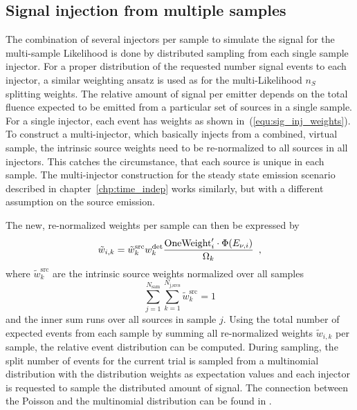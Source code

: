 \subsection{Signal injection from multiple samples}
The combination of several injectors per sample to simulate the signal for the multi-sample Likelihood is done by distributed sampling from each single sample injector.
For a proper distribution of the requested number signal events to each injector, a similar weighting ansatz is used as for the multi-Likelihood $n_S$ splitting weights.
The relative amount of signal per emitter depends on the total fluence expected to be emitted from a particular set of sources in a single sample.
For a single injector, each event has weights as shown in~(\ref{equ:sig_inj_weights}).
To construct a multi-injector, which basically injects from a combined, virtual sample, the intrinsic source weights need to be re-normalized to all sources in all injectors.
This catches the circumstance, that each source is unique in each sample.
The multi-injector construction for the steady state emission scenario described in chapter~\ref{chp:time_indep} works similarly, but with a different assumption on the source emission.

The new, re-normalized weights per sample can then be expressed by
\begin{equation}
    \tilde{w}_{i,k}
    = \tilde{w}_k^\text{src} w_k^\text{det}
      \frac{\text{OneWeight}'_i \cdot \Phi(E_{\nu,i})}{\Omega_k}
  \enspace\text{,}
\end{equation}
where $\tilde{w}_k^\text{src}$ are the intrinsic source weights normalized over all samples
\begin{equation}
  \sum_{j=1}^{N_\text{sam}} \sum_{k=1}^{N_\text{j,srcs}}
  \tilde{w}_k^\text{src} = 1
\end{equation}
and the inner sum runs over all sources in sample $j$.
Using the total number of expected events from each sample by summing all re-normalized weights $\tilde{w}_{i,k}$ per sample, the relative event distribution can be computed.
During sampling, the split number of events for the current trial is sampled from a multinomial distribution with the distribution weights as expectation values and each injector is requested to sample the distributed amount of signal.
The connection between the Poisson and the multinomial distribution can be found in \cite{BOHM20141}.

